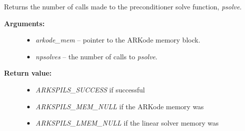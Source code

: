 \documentclass[letterpaper,10pt,english]{sphinxmanual}
\begin{document}
\begin{fulllineitems}
\label{c_interface/User_callable:c.ARKSpilsGetNumPrecSolves}
Returns the number of calls made to the preconditioner
solve function, \emph{psolve}.
\begin{description}
\item[{\textbf{Arguments:}}] \leavevmode\begin{itemize}
\item {} 
\emph{arkode\_mem} -- pointer to the ARKode memory block.

\item {} 
\emph{npsolves} -- the number of calls to \emph{psolve}.

\end{itemize}

\item[{\textbf{Return value:}}] \leavevmode\begin{itemize}
\item {} 
\emph{ARKSPILS\_SUCCESS} if successful

\item {} 
\emph{ARKSPILS\_MEM\_NULL} if the ARKode memory was 

\item {} 
\emph{ARKSPILS\_LMEM\_NULL} if the linear solver memory was 

\end{itemize}

\end{description}

\end{fulllineitems}

\end{document}
